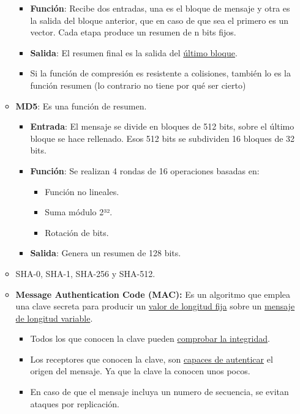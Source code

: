 \documentclass[12pt, twoside, openright]{report} %
\begin{document}
\begin{itemize}
\begin{itemize}
\begin{itemize}
			            \item \textbf{Función}: Recibe dos entradas, una es el bloque de mensaje y otra es la salida del bloque anterior, que en caso de que sea el primero es un vector. Cada etapa produce un resumen de n bits fijos.
			            \item \textbf{Salida}: El resumen final es la salida del
			                  \underline{último bloque}.
			            \item Si la función de compresión es resistente a colisiones, también lo es la función resumen (lo contrario no tiene por qué ser cierto)
		            \end{itemize}
		      \item \textbf{MD5}: Es una función de resumen.
		            \begin{itemize}
			            \item \textbf{Entrada}: El mensaje se divide en bloques de 512 bits, sobre el último bloque se hace rellenado. Esos 512 bits se subdividen 16 bloques de 32 bits.
			            \item \textbf{Función}: Se realizan 4 rondas de 16 operaciones basadas en:
			                  \begin{itemize}
				                  \item Función no lineales.
				                  \item Suma módulo 2³².
				                  \item Rotación de bits.
			                  \end{itemize}
			            \item \textbf{Salida}: Genera un resumen de 128 bits.
		            \end{itemize}
		      \item SHA-0, SHA-1, SHA-256 y SHA-512.
		      \item \textbf{Message Authentication Code (MAC):} Es un algoritmo que emplea una clave secreta para producir un \underline{valor de longitud fija} sobre un \underline{mensaje de longitud variable}.
		            \begin{itemize}
			            \item Todos los que conocen la clave pueden \underline{comprobar la integridad}.
			            \item Los receptores que conocen la clave, son \underline{capaces de autenticar} el origen del mensaje. Ya que la clave la conocen unos pocos.
			            \item En caso de que el mensaje incluya un numero de secuencia, se evitan ataques por replicación.

\end{itemize}
\end{itemize}
\end{itemize}
\end{document}
